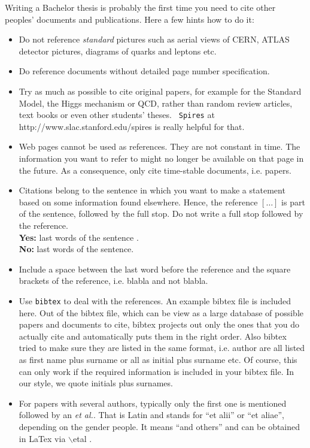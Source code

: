 \documentclass[bachelor,       %
               twoside,        %
               BCOR10mm,       %
               ngerman,english  %
               ]{GAUBM}
\begin{document}
%
%
Writing a Bachelor thesis is probably the first time you need to cite
other peoples' documents and publications. Here a few hints how to do
it:
\begin{itemize}
\item Do not reference {\it standard} pictures such as aerial views of
  CERN, ATLAS detector pictures, diagrams of quarks and leptons etc.
\item Do reference documents without detailed page number specification.
\item Try as much as possible to cite original papers, for example for
  the Standard Model, the Higgs mechanism or QCD, rather than random
  review articles, text books or even other students' theses. {\tt
    Spires} at http://www.slac.stanford.edu/spires is really helpful
  for that.
\item Web pages cannot be used as references. They are not constant in
  time. The information you want to refer to might no longer be
  available on that page in the future. As a consequence, only cite
  time-stable documents, i.e. papers.
\item Citations belong to the sentence in which you want to make a
  statement based on some information found elsewhere. Hence, the
  reference $\left[ \dots \right]$ is part of the sentence, followed
  by the full
  stop. Do not write a full stop followed by the reference.\\
  {\bf Yes:} last words of the sentence \cite{bauer_orr_01}.\\
  {\bf No:} last words of the sentence. \cite{abe_prl74_1995}
\item Include a space between the last word before the reference and
  the square brackets of the reference, i.e. blabla
  \cite{abachi_prl74_1995,pdg2002} and not
  blabla\cite{abachi_prl74_1995,pdg2004}.
\item Use {\tt bibtex} to deal with the references. An example bibtex
  file is included here. Out of the bibtex file, which can be view as
  a large database of possible papers and documents to cite, bibtex
  projects out only the ones that you do actually cite and
  automatically puts them in the right order. Also bibtex tried to
  make sure they are listed in the same format, i.e. author are all
  listed as first name plus surname or all as initial plus surname
  etc. Of course, this can only work if the required information is
  included in your bibtex file. In our style, we quote initials plus
  surnames.
\item For papers with several authors, typically only the first one is
  mentioned followed by an {\it et al.}. That is Latin and stands for
  ``et alii'' or ``et aliae'', depending on the gender people. It
  means ``and others'' and can be obtained in LaTex via
  $\backslash$etal  .
\end{itemize}
\end{document}
